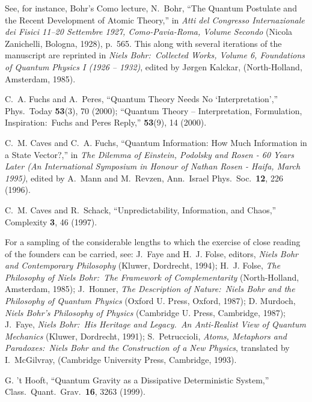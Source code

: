 %
%

\begin{thebibliography}{10}

See, for instance, Bohr's Como lecture, N.~Bohr, ``The Quantum
Postulate and the Recent Development of Atomic Theory,'' in {\sl
Atti del Congresso Internazionale dei Fisici 11--20 Settembre 1927,
Como-Pavia-Roma, Volume Secondo} (Nicola Zanichelli, Bologna,
1928), p.~565.  This along with several iterations of the manuscript
are reprinted in {\sl Niels Bohr:\ Collected Works, Volume 6,
Foundations of Quantum Physics I (1926 -- 1932)}, edited by
J{\o}rgen Kalckar, (North-Holland, Amsterdam, 1985).

C.~A. Fuchs and A.~Peres, ``Quantum Theory Needs No
`Interpretation','' Phys.\ Today {\bf 53}(3), 70 (2000); ``Quantum
Theory -- Interpretation, Formulation, Inspiration:\ Fuchs and Peres
Reply,'' {\bf 53}(9), 14 (2000).

C.~M. Caves and C.~A. Fuchs, ``Quantum Information: How Much
Information in a State Vector?,'' in {\sl The Dilemma of Einstein,
Podolsky and Rosen - 60 Years Later (An International Symposium in
Honour of Nathan Rosen - Haifa, March 1995)}, edited by A.~Mann and
M.~Revzen, Ann.\ Israel Phys.\ Soc.\ {\bf 12}, 226 (1996).

C.~M. Caves and R.~Schack, ``Unpredictability, Information, and
Chaos,'' Complexity {\bf 3}, 46 (1997).

For a sampling of the considerable lengths to which the exercise
of close reading of the founders can be carried, see: J.~Faye and
H.~J. Folse, editors, {\sl Niels Bohr and Contemporary
Philosophy\/} (Kluwer, Dordrecht, 1994); H.~J. Folse, {\sl The
Philosophy of Niels Bohr:~The Framework of Complementarity\/}
(North-Holland, Amsterdam, 1985); J.~Honner, {\sl The Description
of Nature:\ Niels Bohr and the Philosophy of Quantum Physics\/}
(Oxford U. Press, Oxford, 1987); D. Murdoch, {\sl Niels Bohr's
Philosophy of Physics\/} (Cambridge U. Press, Cambridge, 1987);
J.~Faye, {\sl Niels Bohr:\ His Heritage and Legacy.\ An
Anti-Realist View of Quantum Mechanics\/} (Kluwer, Dordrecht,
1991); S.~Petruccioli, {\sl Atoms, Metaphors and Paradoxes:\ Niels
Bohr and the Construction of a New Physics}, translated by
I.~McGilvray, (Cambridge University Press, Cambridge, 1993).

G. 't Hooft, ``Quantum Gravity as a Dissipative Deterministic
System,'' Class.\ Quant.\ Grav.\ {\bf 16}, 3263 (1999).


\end{thebibliography}
